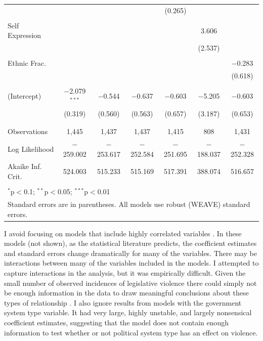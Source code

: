 \documentclass[a4paper]{article}\usepackage[]{graphicx}\usepackage[]{color}
\begin{document}
\begin{table}
\begin{center}
{\begin{tabular}{@{\extracolsep{5pt}}lcccccc}
  &  &  &  & (0.265) &  &  \\ 
  & & & & & & \\ 
 Self Expression &  &  &  &  & 3.606 &  \\ 
  &  &  &  &  & (2.537) &  \\ 
  & & & & & & \\ 
 Ethnic Frac. &  &  &  &  &  & $-$0.283 \\ 
  &  &  &  &  &  & (0.618) \\ 
  & & & & & & \\ 
 (Intercept) & $-$2.079$^{***}$ & $-$0.544 & $-$0.637 & $-$0.603 & $-$5.205 & $-$0.603 \\ 
  & (0.319) & (0.560) & (0.563) & (0.657) & (3.187) & (0.653) \\ 
  & & & & & & \\ 
\hline \\[-1.8ex] 
Observations & 1,445 & 1,437 & 1,437 & 1,415 & 808 & 1,431 \\ 
Log Likelihood & $-$259.002 & $-$253.617 & $-$252.584 & $-$251.695 & $-$188.037 & $-$252.328 \\ 
Akaike Inf. Crit. & 524.003 & 515.233 & 515.169 & 517.391 & 388.074 & 516.657 \\ 
\hline 
\hline \\[-1.8ex] 
\multicolumn{7}{l}{$^{*}$p$<$0.1; $^{**}$p$<$0.05; $^{***}$p$<$0.01} \\ 
\multicolumn{7}{l}{Standard errors are in parentheses. All models use robust (WEAVE) standard errors.} \\ 
\end{tabular} 

}
\end{center}
\end{table}

I avoid focusing on models that include highly correlated variables \citep[]{Achen2002, Schrodt2006}. In these models (not shown), as the statistical literature predicts, the coefficient estimates and standard errors change dramatically for many of the variables. There may be interactions between many of the variables included in the models. I attempted to capture interactions in the analysis, but it was empirically difficult. Given the small number of observed incidences of legislative violence there could simply not be enough information in the data to draw meaningful conclusions about these types of relationship \citep[]{Brambor2006}. I also ignore results from models with the government system type variable. It had very large, highly unstable, and largely nonsensical coefficient estimates, suggesting that the model does not contain enough information to test \citep{Babyak2004} whether or not political system type has an effect on violence.
\end{document}
